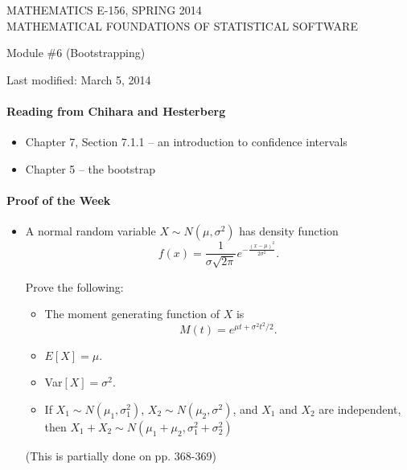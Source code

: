\documentclass[12pt]{article}
\begin{document}
\begin{center}
MATHEMATICS E-156, SPRING 2014 \\
MATHEMATICAL FOUNDATIONS OF STATISTICAL SOFTWARE

\smallskip

Module \#6 (Bootstrapping)
\end{center}

Last modified: March 5, 2014

\medskip

\paragraph*{Reading from Chihara and Hesterberg}

\begin{itemize}
\item Chapter 7, Section 7.1.1 -- an introduction to confidence intervals
\item Chapter 5 -- the bootstrap

\end{itemize}




\paragraph*{Proof of the Week}
\begin{itemize}
\item A normal random variable $X \sim N(\mu,\sigma^2)$ has density function $$f(x) = \frac{1}{\sigma\sqrt{2\pi}}e^{-\frac{(x-\mu)^2}{2\sigma^2}}.$$

Prove the following:
\begin{itemize}
\item The moment generating function of $X$ is $$M(t) = e^{\mu t + \sigma^2t^2/2}.$$
\item $E[X] = \mu.$
\item Var$[X] = \sigma^2.$
\item If  $X_1 \sim N(\mu_1,\sigma_1^2)$,  $X_2 \sim N(\mu_2,\sigma^2)$, and $X_1$ and $X_2$ are independent, then
 $X_1 + X_2 \sim N(\mu_1 + \mu_2,\sigma_1^2 + \sigma_2^2 )$
\end{itemize}

(This is partially done on pp. 368-369)
\end{itemize}

\pagebreak
\end{document}
